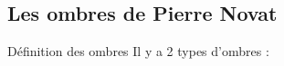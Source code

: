 \documentclass{beamer}
\begin{document}
\subsection*{Les ombres de Pierre Novat}
\begin{frame}{Définition des ombres}
    Il y a 2 types d'ombres : 
    \begin{center}
    \begin{minipage}[c]{0.45\linewidth}
    \begin{center}
    	\\

\end{center}
\end{minipage}
\end{center}
\end{frame}
\end{document}
